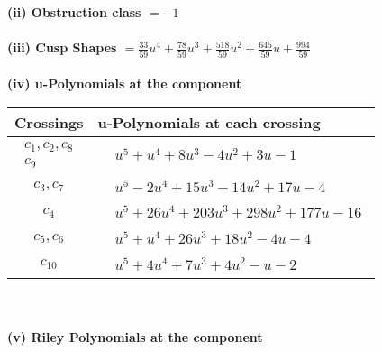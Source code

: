 \documentclass[1p]{elsarticle_modified}
\theoremstyle{definition}
\begin{document}
\flushleft \textbf{(ii) Obstruction class $= -1$}\\~\\
\flushleft \textbf{(iii) Cusp Shapes $= \frac{33}{59} u^4+\frac{78}{59} u^3+\frac{518}{59} u^2+\frac{645}{59} u+\frac{994}{59}$}\\~\\
\newpage\renewcommand{\arraystretch}{1}
\flushleft \textbf{(iv) u-Polynomials at the component}\newline \\
\begin{tabular}{m{50pt}|m{274pt}}
Crossings & \hspace{64pt}u-Polynomials at each crossing \\
\hline $$\begin{aligned}c_{1},c_{2},c_{8}\\c_{9}\end{aligned}$$&$\begin{aligned}
&u^5+u^4+8 u^3-4 u^2+3 u-1
\end{aligned}$\\
\hline $$\begin{aligned}c_{3},c_{7}\end{aligned}$$&$\begin{aligned}
&u^5-2 u^4+15 u^3-14 u^2+17 u-4
\end{aligned}$\\
\hline $$\begin{aligned}c_{4}\end{aligned}$$&$\begin{aligned}
&u^5+26 u^4+203 u^3+298 u^2+177 u-16
\end{aligned}$\\
\hline $$\begin{aligned}c_{5},c_{6}\end{aligned}$$&$\begin{aligned}
&u^5+u^4+26 u^3+18 u^2-4 u-4
\end{aligned}$\\
\hline $$\begin{aligned}c_{10}\end{aligned}$$&$\begin{aligned}
&u^5+4 u^4+7 u^3+4 u^2- u-2
\end{aligned}$\\
\hline
\end{tabular}\\~\\
\newpage\renewcommand{\arraystretch}{1}
\flushleft \textbf{(v) Riley Polynomials at the component}\newline \\
\end{document}
